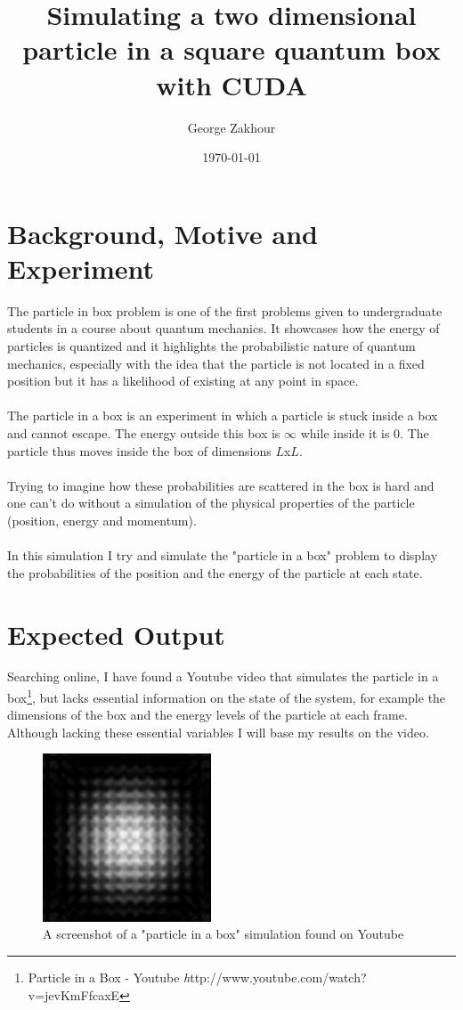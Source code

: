 \documentclass[a4paper, 10pt]{article}
\author{George Zakhour}
\title{{\bf Simulating a two dimensional particle in a square quantum box with
        CUDA}}
\date{\today}
\begin{document}
\maketitle
\newpage
\tableofcontents
\newpage

\section{Background, Motive and Experiment}
The particle in box problem is one of the first problems given to undergraduate
students in a course about quantum mechanics. It showcases how the energy
of particles is quantized and it highlights the probabilistic nature of
quantum mechanics, especially with the idea that the particle is not located in
a fixed position but it has a likelihood of existing at any point in space.\\\\
The particle in a box is an experiment in which a particle is stuck inside a
box and cannot escape. The energy outside this box is $\infty$ while inside it
is $0$. The particle thus moves inside the box of dimensions $L$x$L$.\\\\
Trying to imagine how these probabilities are scattered in the box is hard and one
can't do without a simulation of the physical properties of the particle
(position, energy and momentum).\\\\
In this simulation I try and simulate the "particle in a box" problem to
display the probabilities of the position and the energy of the particle at
each state.

\section{Expected Output}
Searching online, I have found a Youtube video that simulates the particle in a
box\footnote{ Particle in a Box - Youtube {\emph
http://www.youtube.com/watch?v=jevKmFfcaxE}}, but lacks essential information
on the state of the system, for example the dimensions of the box and the
energy levels of the particle at each frame. Although lacking these
essential variables I will base my results on the video.\\

\begin{figure}[hb]
    \centering
        \includegraphics[width=5cm]{graphics/online_simulation.png}
    \caption{A screenshot of a "particle in a box" simulation found on Youtube}
\end{figure}
\end{document}
